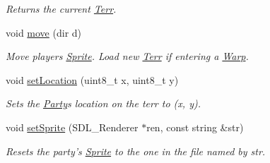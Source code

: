 \begin{DoxyCompactItemize}
\begin{DoxyCompactList}\small\item\em Returns the current \hyperlink{class_terr}{Terr}. \end{DoxyCompactList}\item 
void \hyperlink{class_party_a6260aeac8da674bc894709ad392c1360}{move} (dir d)\hypertarget{class_party_a6260aeac8da674bc894709ad392c1360}{}\label{class_party_a6260aeac8da674bc894709ad392c1360}

\begin{DoxyCompactList}\small\item\em Move player\textquotesingle{}s \hyperlink{class_sprite}{Sprite}. Load new \hyperlink{class_terr}{Terr} if entering a \hyperlink{class_warp}{Warp}. \end{DoxyCompactList}\item 
void \hyperlink{class_party_abbadcf231d80923fdd0fdcf71c1b3080}{set\+Location} (uint8\+\_\+t x, uint8\+\_\+t y)\hypertarget{class_party_abbadcf231d80923fdd0fdcf71c1b3080}{}\label{class_party_abbadcf231d80923fdd0fdcf71c1b3080}

\begin{DoxyCompactList}\small\item\em Sets the \hyperlink{class_party}{Party}\textquotesingle{}s location on the terr to (x, y). \end{DoxyCompactList}\item 
void \hyperlink{class_party_abe069ffbbf3352f6b39246c8382dd26b}{set\+Sprite} (S\+D\+L\+\_\+\+Renderer $\ast$ren, const string \&str)\hypertarget{class_party_abe069ffbbf3352f6b39246c8382dd26b}{}\label{class_party_abe069ffbbf3352f6b39246c8382dd26b}

\begin{DoxyCompactList}\small\item\em Resets the party’s \hyperlink{class_sprite}{Sprite} to the one in the file named by str. \end{DoxyCompactList}\end{DoxyCompactItemize}
